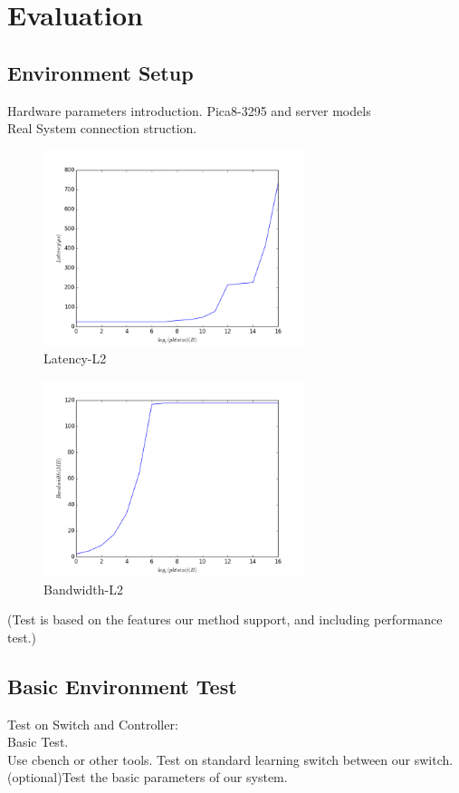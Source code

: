 \documentclass{acm_proc_article-sp}
\begin{document}
\section{Evaluation}

\subsection{Environment Setup}
Hardware parameters introduction. Pica8-3295 and server models\\
Real System connection struction.\\

\begin{figure}[htbp]
\includegraphics[width=3in]{image/latency}
\caption{Latency-L2}\label{fig:latency-l2}
\end{figure}
\begin{figure}[htbp]
\includegraphics[width=3in]{image/bandwidth}
\caption{Bandwidth-L2}\label{fig:Bandwidth-l2}
\end{figure}

(Test is based on the features our method support, and including performance test.)

\subsection{Basic Environment Test}
Test on Switch and Controller:\\
Basic Test.\\
Use cbench or other tools. Test on standard learning switch between our switch.\\
(optional)Test the basic parameters of our system.
\end{document}
